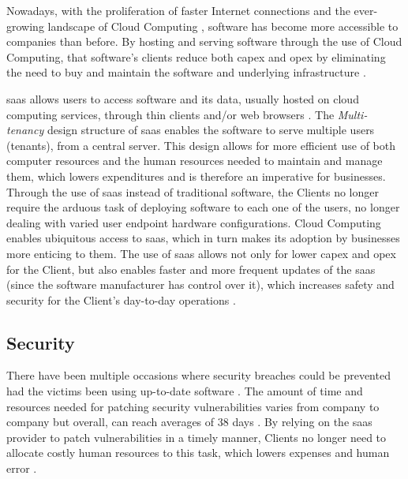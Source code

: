 Nowadays, with the proliferation of faster Internet connections and the ever-growing landscape of Cloud Computing
\Parencite{dillon_tharam_and_wu_chen_and_chang_elizabeth}, software has become more accessible to companies than before.
By hosting and serving software through the use of Cloud Computing, that software's clients reduce both \gls{capex} and \gls{opex} by eliminating the need to buy and maintain the software and underlying infrastructure \Parencite{alnumay_2020}.

\gls{saas} allows users to access software and its data, usually hosted on cloud computing services, through thin clients and/or web browsers \Parencites{mell_grance_2011}{Ali_Abdulrazzaq_and_Md_Sultan_Abu_Bakar_and_abdul_ghani_Abdul_azim_and_Zulzalil_Hazura}. The \textit{Multi-tenancy} design structure of \gls{saas} enables the software to serve multiple users (tenants), from a central server. This design allows for more efficient use of both computer resources and the human resources needed to maintain and manage them, which lowers expenditures and is therefore an imperative for businesses. Through the use of \gls{saas} instead of traditional software, the Clients no longer require the arduous task of deploying software to each one of the users, no longer dealing with varied user endpoint hardware configurations.
Cloud Computing enables ubiquitous access to \gls{saas}, which in turn makes its adoption by businesses more enticing to them. The use of \gls{saas} allows not only for lower \gls{capex} and \gls{opex} for the Client, but also enables faster and more frequent updates of the \gls{saas} (since the software manufacturer has control over it), which increases safety and security for the Client's day-to-day operations \Parencite{cavusoglu_cavusoglu_zhang_2008}. 

\subsection{Security}\label{state-of-the-art:ss:security}

There have been multiple occasions where security breaches could be prevented had the victims been using up-to-date software \Parencite{glenn_2018}. The amount of time and resources needed for patching security vulnerabilities varies from company to company but overall, can reach averages of 38 days \Parencite{rapid7_2018}. By relying on the \gls{saas} provider to patch vulnerabilities in a timely manner, Clients no longer need to allocate costly human resources to this task, which lowers expenses and human error \Parencite{glenn_2018}. 

